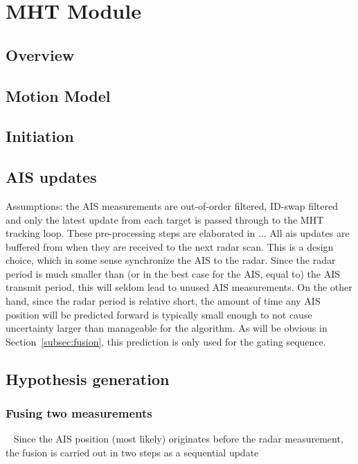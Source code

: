 
\chapter{MHT Module}\label{chapter:mht-module}

\section{Overview}

\section{Motion Model}\label{sec:motion-model}

\section{Initiation}

\section{AIS updates}
Assumptions: the AIS measurements are out-of-order filtered, ID-swap filtered and only the latest update from each target is passed through to the MHT tracking loop. These pre-processing steps are elaborated in ...
All \gls{ais} updates are buffered from when they are received to the next radar scan. This is a design choice, which in some sense synchronize the AIS to the radar. Since the radar period is much smaller than (or in the best case for the AIS, equal to) the AIS transmit period, this will seldom lead to unused AIS measurements. On the other hand, since the radar period is relative short, the amount of time any AIS position will be predicted forward is typically small enough to not cause uncertainty larger than manageable for the algorithm. As will be obvious in Section~\ref{subsec:fusion}, this prediction is only used for the gating sequence.

\section{Hypothesis generation}



\subsection{Fusing two measurements}~\label{subsec:fusion}
Since the AIS position (most likely) originates before the radar measurement, the fusion is carried out in two steps as a sequential update~\cite{Bar-Shalom1995}

